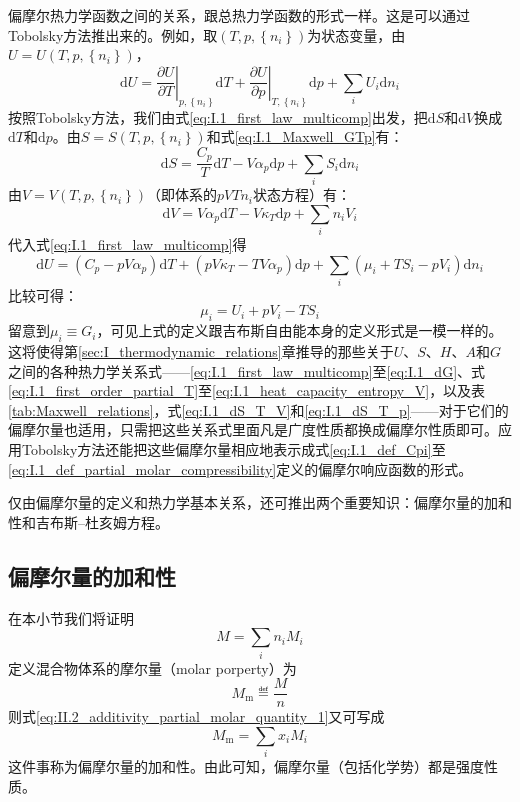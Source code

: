 \documentclass[main.tex]{subfiles}
\begin{document}
偏摩尔热力学函数之间的关系，跟总热力学函数的形式一样。这是可以通过Tobolsky方法推出来的。例如，取$\left(T,p,\left\{n_i\right\}\right)$为状态变量，由$U=U\left(T,p,\left\{n_i\right\}\right)$，
\[\mathrm{d}U=\left.\frac{\partial U}{\partial T}\right|_{p,\left\{n_i\right\}}\mathrm{d}T+\left.\frac{\partial U}{\partial p}\right|_{T,\left\{n_i\right\}}\mathrm{d}p+\sum_i U_i\mathrm{d}n_i\]
按照Tobolsky方法，我们由式\eqref{eq:I.1_first_law_multicomp}出发，把$\mathrm{d}S$和$\mathrm{d}V$换成$\mathrm{d}T$和$\mathrm{d}p$。由$S=S\left(T,p,\left\{n_i\right\}\right)$和式\eqref{eq:I.1_Maxwell_GTp}有：
\[\mathrm{d}S=\frac{C_p}{T}\mathrm{d}T-V\alpha_p\mathrm{d}p+\sum_iS_i\mathrm{d}n_i\]
由$V=V\left(T,p,\left\{n_i\right\}\right)$（即体系的$pVTn_i$状态方程）有：
\[\mathrm{d}V=V\alpha_p\mathrm{d}T-V\kappa_T\mathrm{d}p+\sum_in_iV_i\]
代入式\eqref{eq:I.1_first_law_multicomp}得
\[\mathrm{d}U=\left(C_p-pV\alpha_p\right)\mathrm{d}T+\left(pV\kappa_T-TV\alpha_p\right)\mathrm{d}p+\sum_i\left(\mu_i+TS_i-pV_i\right)\mathrm{d}n_i\]
比较可得：
\begin{equation}\label{eq:II.2_partial_molar_thermodynamic_functions_relation}
    \mu_i=U_i+pV_i-TS_i
\end{equation}
留意到$\mu_i\equiv G_i$，可见上式的定义跟吉布斯自由能本身的定义形式是一模一样的。这将使得第\ref{sec:I_thermodynamic_relations}章推导的那些关于$U$、$S$、$H$、$A$和$G$之间的各种热力学关系式——\eqref{eq:I.1_first_law_multicomp}至\eqref{eq:I.1_dG}、式\eqref{eq:I.1_first_order_partial_T}至\eqref{eq:I.1_heat_capacity_entropy_V}，以及表\ref{tab:Maxwell_relations}，式\eqref{eq:I.1_dS_T_V}和\eqref{eq:I.1_dS_T_p}——对于它们的偏摩尔量也适用，只需把这些关系式里面凡是广度性质都换成偏摩尔性质即可。应用Tobolsky方法还能把这些偏摩尔量相应地表示成式\eqref{eq:I.1_def_Cpi}至\eqref{eq:I.1_def_partial_molar_compressibility}定义的偏摩尔响应函数的形式。

仅由偏摩尔量的定义和热力学基本关系，还可推出两个重要知识：偏摩尔量的加和性和吉布斯--杜亥姆方程。

\subsection{偏摩尔量的加和性}
在本小节我们将证明
\begin{equation}\label{eq:II.2_additivity_partial_molar_quantity_1}
    M=\sum_in_iM_i
\end{equation}
定义混合物体系的摩尔量（molar porperty）为
\[M_\text{m}\eqdef \frac{M}{n}\]
则式\eqref{eq:II.2_additivity_partial_molar_quantity_1}又可写成
\begin{equation}\label{eq:II.2_additivity_partial_molar_quantity_2}
    M_\text{m}=\sum_ix_iM_i
\end{equation}
这件事称为偏摩尔量的加和性。由此可知，偏摩尔量（包括化学势）都是强度性质。
\end{document}

